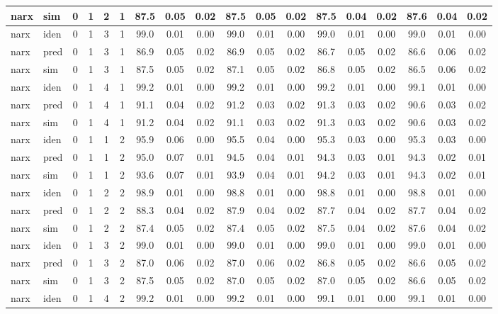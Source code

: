 \begin{landscape}
\begin{center}
\begin{longtable}{ll|cccc|ccc|ccc|ccc|ccc}
narx & sim  & 0 & 1 & 2 & 1 & 87.5 & 0.05 & 0.02 & 87.5 & 0.05 & 0.02 & 87.5 & 0.04 & 0.02 & 87.6 & 0.04 & 0.02 \\ 
 \hline 
narx & iden & 0 & 1 & 3 & 1 & 99.0 & 0.01 & 0.00 & 99.0 & 0.01 & 0.00 & 99.0 & 0.01 & 0.00 & 99.0 & 0.01 & 0.00 \\ 
narx & pred & 0 & 1 & 3 & 1 & 86.9 & 0.05 & 0.02 & 86.9 & 0.05 & 0.02 & 86.7 & 0.05 & 0.02 & 86.6 & 0.06 & 0.02 \\ 
narx & sim  & 0 & 1 & 3 & 1 & 87.5 & 0.05 & 0.02 & 87.1 & 0.05 & 0.02 & 86.8 & 0.05 & 0.02 & 86.5 & 0.06 & 0.02 \\ 
 \hline 
narx & iden & 0 & 1 & 4 & 1 & 99.2 & 0.01 & 0.00 & 99.2 & 0.01 & 0.00 & 99.2 & 0.01 & 0.00 & 99.1 & 0.01 & 0.00 \\ 
narx & pred & 0 & 1 & 4 & 1 & 91.1 & 0.04 & 0.02 & 91.2 & 0.03 & 0.02 & 91.3 & 0.03 & 0.02 & 90.6 & 0.03 & 0.02 \\ 
narx & sim  & 0 & 1 & 4 & 1 & 91.2 & 0.04 & 0.02 & 91.1 & 0.03 & 0.02 & 91.3 & 0.03 & 0.02 & 90.6 & 0.03 & 0.02 \\ 
 \hline 
narx & iden & 0 & 1 & 1 & 2 & 95.9 & 0.06 & 0.00 & 95.5 & 0.04 & 0.00 & 95.3 & 0.03 & 0.00 & 95.3 & 0.03 & 0.00 \\ 
narx & pred & 0 & 1 & 1 & 2 & 95.0 & 0.07 & 0.01 & 94.5 & 0.04 & 0.01 & 94.3 & 0.03 & 0.01 & 94.3 & 0.02 & 0.01 \\ 
narx & sim  & 0 & 1 & 1 & 2 & 93.6 & 0.07 & 0.01 & 93.9 & 0.04 & 0.01 & 94.2 & 0.03 & 0.01 & 94.3 & 0.02 & 0.01 \\ 
 \hline 
narx & iden & 0 & 1 & 2 & 2 & 98.9 & 0.01 & 0.00 & 98.8 & 0.01 & 0.00 & 98.8 & 0.01 & 0.00 & 98.8 & 0.01 & 0.00 \\ 
narx & pred & 0 & 1 & 2 & 2 & 88.3 & 0.04 & 0.02 & 87.9 & 0.04 & 0.02 & 87.7 & 0.04 & 0.02 & 87.7 & 0.04 & 0.02 \\ 
narx & sim  & 0 & 1 & 2 & 2 & 87.4 & 0.05 & 0.02 & 87.4 & 0.05 & 0.02 & 87.5 & 0.04 & 0.02 & 87.6 & 0.04 & 0.02 \\ 
 \hline 
narx & iden & 0 & 1 & 3 & 2 & 99.0 & 0.01 & 0.00 & 99.0 & 0.01 & 0.00 & 99.0 & 0.01 & 0.00 & 99.0 & 0.01 & 0.00 \\ 
narx & pred & 0 & 1 & 3 & 2 & 87.0 & 0.06 & 0.02 & 87.0 & 0.06 & 0.02 & 86.8 & 0.05 & 0.02 & 86.6 & 0.05 & 0.02 \\ 
narx & sim  & 0 & 1 & 3 & 2 & 87.5 & 0.05 & 0.02 & 87.0 & 0.05 & 0.02 & 87.0 & 0.05 & 0.02 & 86.6 & 0.05 & 0.02 \\ 
 \hline 
narx & iden & 0 & 1 & 4 & 2 & 99.2 & 0.01 & 0.00 & 99.2 & 0.01 & 0.00 & 99.1 & 0.01 & 0.00 & 99.1 & 0.01 & 0.00 \\ 

\end{longtable}
\end{center}
\end{landscape}
